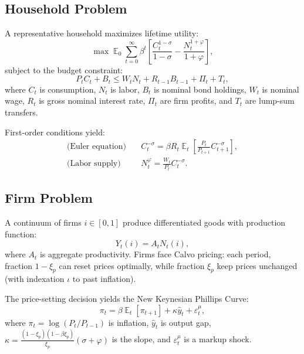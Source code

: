 \documentclass[12pt]{article}
\theoremstyle{plain}
\theoremstyle{definition}
\theoremstyle{remark}
\DeclareMathOperator{\E}{\mathbb{E}}
\newcommand{\eps}{\varepsilon}
\begin{document}
\subsection{Household Problem}

A representative household maximizes lifetime utility:
\begin{equation}
\max \E_0 \sum_{t=0}^\infty \beta^t \left[ \frac{C_t^{1-\sigma}}{1-\sigma} - \frac{N_t^{1+\varphi}}{1+\varphi} \right],
\end{equation}
subject to the budget constraint:
\begin{equation}
P_t C_t + B_t \leq W_t N_t + R_{t-1} B_{t-1} + \Pi_t + T_t,
\end{equation}
where $C_t$ is consumption, $N_t$ is labor, $B_t$ is nominal bond holdings, $W_t$ is nominal wage, $R_t$ is gross nominal interest rate, $\Pi_t$ are firm profits, and $T_t$ are lump-sum transfers.

First-order conditions yield:
\begin{align}
\text{(Euler equation)} \quad & C_t^{-\sigma} = \beta R_t \E_t\left[ \frac{P_t}{P_{t+1}} C_{t+1}^{-\sigma} \right], \label{eq:euler_full} \\
\text{(Labor supply)} \quad & N_t^\varphi = \frac{W_t}{P_t} C_t^{-\sigma}. \label{eq:labor_supply_full}
\end{align}


\subsection{Firm Problem}

A continuum of firms $i \in [0,1]$ produce differentiated goods with production function:
\begin{equation}
Y_t(i) = A_t N_t(i),
\end{equation}
where $A_t$ is aggregate productivity. Firms face Calvo pricing: each period, fraction $1-\xi_p$ can reset prices optimally, while fraction $\xi_p$ keep prices unchanged (with indexation $\iota$ to past inflation).

The price-setting decision yields the New Keynesian Phillips Curve:
\begin{equation}
\pi_t = \beta \E_t[\pi_{t+1}] + \kappa \hat{y}_t + \eps_t^\mu, \label{eq:nkpc_full}
\end{equation}
where $\pi_t = \log(P_t/P_{t-1})$ is inflation, $\hat{y}_t$ is output gap, $\kappa = \frac{(1-\xi_p)(1-\beta\xi_p)}{\xi_p}(\sigma + \varphi)$ is the slope, and $\eps_t^\mu$ is a markup shock.
\end{document}
